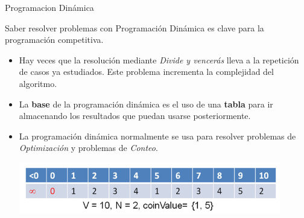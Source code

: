 \documentclass[10pt]{beamer}
\begin{document}
\begin{frame}{Programacion Dinámica}

  Saber resolver problemas con Programación Dinámica es clave para la
  programación competitiva.

  \begin{itemize}
  \item Hay veces que la resolución mediante \emph{Divide y vencerás}
    lleva a la repetición de casos ya estudiados. Este problema
    incrementa la complejidad del algoritmo. \pause

  \item La \textbf{base} de la programación dinámica es el uso de una
    \textbf{tabla} para ir almacenando los resultados que puedan
    usarse posteriormente. \pause

  \item La programación dinámica normalmente se usa para resolver
    problemas de \emph{Optimización} y problemas de \emph{Conteo}. \pause

    \centering\includegraphics[width=0.9\textwidth]{dp.png}
  \end{itemize}
\end{frame}
\end{document}
